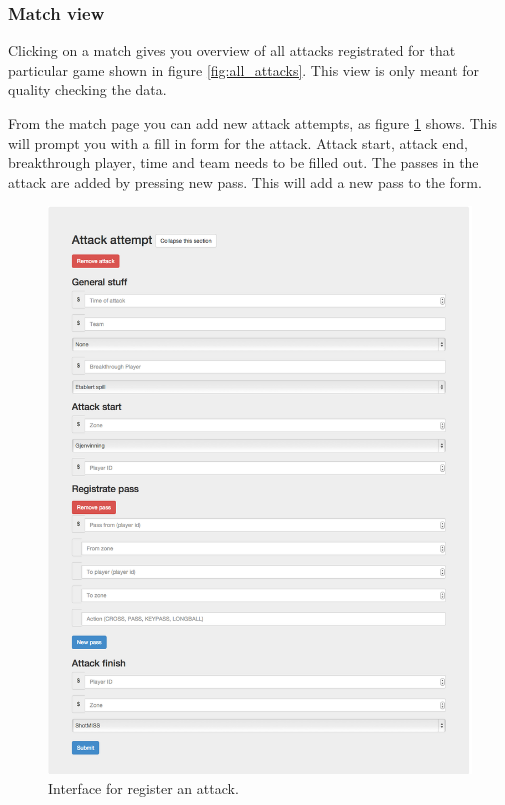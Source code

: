 \subsubsection{Match view}

Clicking on a match gives you overview of all attacks registrated for that particular game shown in figure \ref{fig:all_attacks}. This view is only meant for quality checking the data.

From the match page you can add new attack attempts, as figure \ref{fig:reg_attack} shows. This will prompt you with a fill in form for the attack. Attack start, attack end, breakthrough player, time and team needs to be filled out. The passes in the attack are added by pressing new pass. This will add a new pass to the form.

\begin{figure}[ht!]
\centering
\includegraphics[width=1\textwidth]{images/general/reg_attack.png}
\caption{Interface for register an attack.}
\label{fig:reg_attack}
\end{figure}

